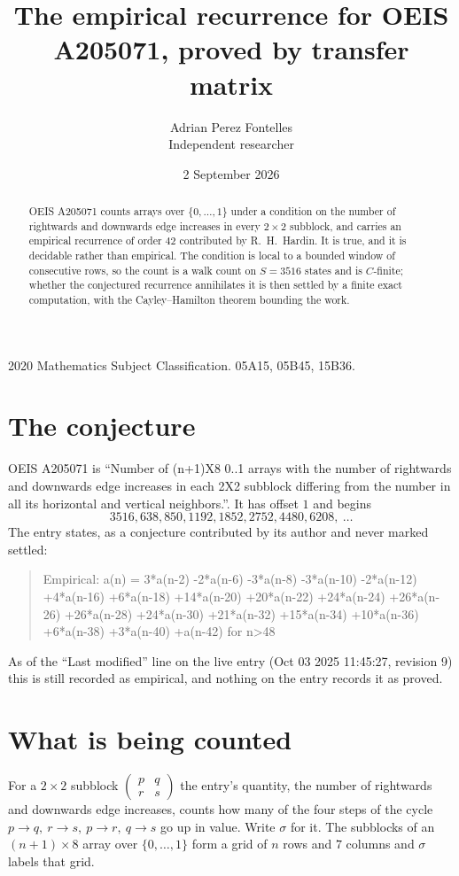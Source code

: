 \documentclass[11pt,a4paper]{article}
\title{The empirical recurrence for OEIS A205071, proved by transfer matrix}
\author{Adrian Perez Fontelles\\ \small Independent researcher}
\date{2 September 2026}
\theoremstyle{plain}
\theoremstyle{definition}
\begin{document}
\maketitle

\begin{abstract}
OEIS A205071 counts arrays over $\{0,\dots,1\}$ under a condition on the number of rightwards and downwards edge increases
in every $2\times2$ subblock, and carries an empirical recurrence of order $42$ contributed by
R.~H.~Hardin. It is true, and it is decidable rather than empirical. The condition is local to
a bounded window of consecutive rows, so the count is a walk count on $S=3516$ states and is
$C$-finite; whether the conjectured recurrence annihilates it is then settled by a finite exact
computation, with the Cayley--Hamilton theorem bounding the work.
\end{abstract}

\noindent\small 2020 Mathematics Subject Classification. 05A15, 05B45, 15B36.\normalsize

\section{The conjecture}

OEIS A205071 is ``Number of (n+1)X8 0..1 arrays with the number of rightwards and downwards edge increases in each 2X2 subblock differing from the number in all its horizontal and vertical neighbors.''. It has offset $1$ and begins
\[
3516, 638, 850, 1192, 1852, 2752, 4480, 6208,\ \dots
\]
The entry states, as a conjecture contributed by its author and never marked settled:
\begin{quote}
Empirical: a(n) = 3*a(n-2) -2*a(n-6) -3*a(n-8) -3*a(n-10) -2*a(n-12) +4*a(n-16) +6*a(n-18) +14*a(n-20) +20*a(n-22) +24*a(n-24) +26*a(n-26) +26*a(n-28) +24*a(n-30) +21*a(n-32) +15*a(n-34) +10*a(n-36) +6*a(n-38) +3*a(n-40) +a(n-42) for n>48
\end{quote}
As of the ``Last modified'' line on the live entry (Oct 03 2025 11:45:27, revision 9) this is still
recorded as empirical, and nothing on the entry records it as proved.

\section{What is being counted}

For a $2\times2$ subblock $\begin{pmatrix}p&q\\r&s\end{pmatrix}$ the
entry's quantity, the number of rightwards and downwards edge increases, counts how many of the four steps of the cycle $p\to q,\ r\to s,\ p\to r,\ q\to s$ go up in value. Write $\sigma$ for it. The subblocks of an
$(n+1)\times8$ array over $\{0,\dots,1\}$ form a grid of $n$ rows and $7$
columns and $\sigma$ labels that grid.
\end{document}
